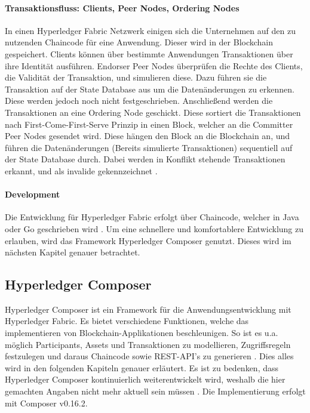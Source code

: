 \paragraph{Transaktionsfluss: Clients, Peer Nodes, Ordering Nodes}
In einen Hyperledger Fabric Netzwerk einigen sich die Unternehmen auf den zu nutzenden Chaincode für eine Anwendung. Dieser wird in der Blockchain gespeichert. Clients können über bestimmte Anwendungen Transaktionen über ihre Identität ausführen. Endorser Peer Nodes überprüfen die Rechte des Clients, die Validität der Transaktion, und simulieren diese. Dazu führen sie die Transaktion auf der State Database aus um die Datenänderungen zu erkennen. Diese werden jedoch noch nicht festgeschrieben. Anschließend werden die Transaktionen an eine Ordering Node geschickt. Diese sortiert die Transaktionen nach First-Come-First-Serve Prinzip in einen Block, welcher an die Committer Peer Nodes gesendet wird. Diese hängen den Block an die Blockchain an, und führen die Datenänderungen (Bereits simulierte Transaktionen) sequentiell auf der State Database durch. Dabei werden in Konflikt stehende Transaktionen erkannt, und als invalide gekennzeichnet \cite{SchererPerformanceScalabilityBlockchain2017}.

\paragraph{Development}
Die Entwicklung für Hyperledger Fabric erfolgt über Chaincode, welcher in Java oder Go geschrieben wird \cite{HyperledgerFabricTeamSDKsHyperledgerFabric}. Um eine schnellere und komfortablere Entwicklung zu erlauben, wird das Framework Hyperledger Composer genutzt. Dieses wird im nächsten Kapitel genauer betrachtet.


\subsection{Hyperledger Composer}
Hyperledger Composer ist ein Framework für die Anwendungsentwicklung mit Hyperledger Fabric. Es bietet verschiedene Funktionen, welche das implementieren von Blockchain-Applikationen beschleunigen. So ist es u.a. möglich Participants, Assets und Transaktionen zu modellieren, Zugriffsregeln festzulegen und daraus Chaincode sowie REST-API's zu generieren \cite{HyperledgerComposerTeamIntroductionHyperledgerComposer}. Dies alles wird in den folgenden Kapiteln genauer erläutert. Es ist zu bedenken, dass Hyperledger Composer kontinuierlich weiterentwickelt wird, weshalb die hier gemachten Angaben nicht mehr aktuell sein müssen \cite{HyperledgerComposerTeamHyperledgerComposerReleases2018}. Die Implementierung erfolgt mit Composer v0.16.2.

